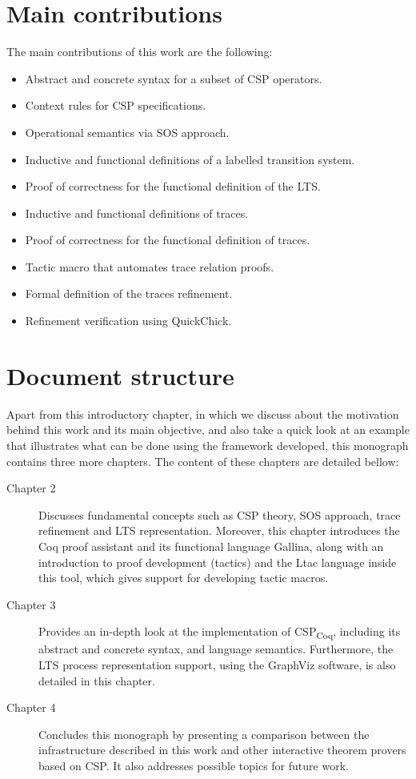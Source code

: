 \section{Main contributions}

The main contributions of this work are the following:

\begin{itemize}
	\item Abstract and concrete syntax for a subset of CSP operators.
	\item Context rules for CSP specifications.
	\item Operational semantics via SOS approach.
	\item Inductive and functional definitions of a labelled transition system.
	\item Proof of correctness for the functional definition of the LTS.
	\item Inductive and functional definitions of traces.
	\item Proof of correctness for the functional definition of traces.
	\item Tactic macro that automates trace relation proofs.
	\item Formal definition of the traces refinement.
	\item Refinement verification using QuickChick.
\end{itemize}

\section{Document structure}

Apart from this introductory chapter, in which we discuss about the motivation behind this work and its main objective, and also take a quick look at an example that illustrates what can be done using the framework developed, this monograph contains three more chapters. The content of these chapters are detailed bellow:
\begin{description}
	\item [Chapter 2] Discusses fundamental concepts such as CSP theory, SOS approach, trace refinement and LTS representation. Moreover, this chapter introduces the Coq proof assistant and its functional language Gallina, along with an introduction to proof development (tactics) and the Ltac language inside this tool, which gives support for developing tactic macros.
	\item [Chapter 3] Provides an in-depth look at the implementation of CSP\textsubscript{Coq}, including its abstract and concrete syntax, and language semantics. Furthermore, the LTS process representation support, using the GraphViz software, is also detailed in this chapter.
	\item [Chapter 4] Concludes this monograph by presenting a comparison between the infrastructure described in this work and other interactive theorem provers based on CSP. It also addresses possible topics for future work.
\end{description}